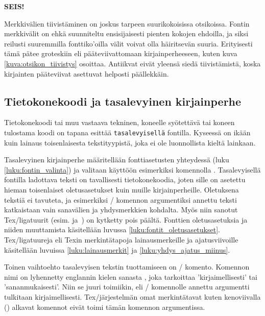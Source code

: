 \begin{tulossis}
  {\sffamily\bfseries{} SEIS!}
\end{tulossis}

Merkkivälien tiivistäminen on joskus tarpeen suurikokoisissa otsikoissa.
Fontin merkkivälit on ehkä suunniteltu ensisijaisesti pienten kokojen
ehdoilla, ja siksi reilusti suuremmilla fonttiko'oilla välit voivat olla
häiritsevän suuria. Erityisesti tämä pätee groteskiin eli
pääteviivattomaan kirjainperheeseen, kuten kuva
\ref{kuva:otsikon_tiivistys} osoittaa. Antiikvat eivät yleensä siedä
tiivistämistä, koska kirjainten pääteviivat asettuvat helposti
päällekkäin.


\subsection{Tietokonekoodi ja tasalevyinen kirjainperhe}

Tietokonekoodi tai muu vastaava tekninen, koneelle syötettävä tai koneen
tulostama koodi on tapana esittää \texttt{tasalevyisellä} fontilla.
Kyseessä on ikään kuin lainaus toisenlaisesta tekstityypistä, joka ei
ole luonnollista kieltä lainkaan.

Tasalevyinen kirjainperhe määritellään fonttiasetusten yhteydessä (luku
\ref{luku:fontin_valinta}) ja valitaan käyttöön esimerkiksi komennolla
. Tasalevyisellä fontilla ladottava teksti on
tavallisesti tietokonekoodia, joten sille on asetettu hieman
toisenlaiset oletusasetukset kuin muille kirjainperheille. Oletuksena
tekstiä ei tavuteta, ja esimerkiksi \-/ komennon
argumentiksi annettu teksti katkaistaan vain sanavälien ja yhdysmerkkien
kohdalta. Myös niin sanotut Tex\-/ligatuurit (esim. 
ja~\koodi{--}) on kytketty pois päältä. Fonttien oletusasetuksia ja
niiden muuttamista käsitellään luvussa
\ref{luku:fontit_oletusasetukset}. Tex\-/ligatuureja eli Texin
merkintätapoja lainausmerkeille ja ajatusviivoille käsitellään luvuissa
\ref{luku:lainausmerkit} ja \ref{luku:yhdys_ajatus_miinus}.

Toinen vaihtoehto tasalevyisen tekstin tuottamiseen on
\-/ komento. Komennon nimi on lyhennetty englannin kielen
sanasta \textit{}, joka tarkoittaa 'kirjaimellisesti'
tai 'sananmukaisesti'. Niin se juuri toimiikin, eli \-/
komennolle annettu argumentti tulkitaan kirjaimellisesti.
Tex\-/järjestelmän omat merkintätavat kuten kenoviivalla (\koodi{\keno})
alkavat komennot eivät toimi tämän komennon argumentissa.


